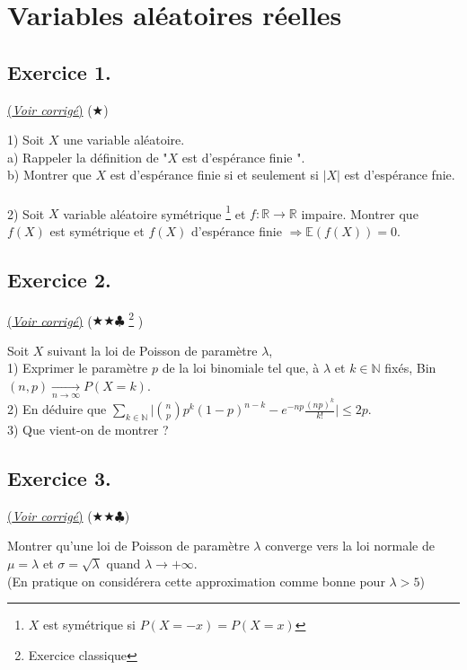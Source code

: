 \documentclass{article}
\newcommand{\R}{\mathbb{R}}
\newcommand{\N}{\mathbb{N}}
\newcommand{\E}{\mathbb{E}}
\newcommand{\Ra}{\Rightarrow}
\newcommand{\ra}{\rightarrow}
\newcommand{\0}{\emptyset}
\begin{document}
\section*{Variables aléatoires réelles}

\subsection*{Exercice 1.}
\hyperref[subsec:corr1]{(\textit{Voir corrigé})} ($\bigstar$)
\label{subsec:ex1}
\begin{flushleft}
1) Soit $X$ une variable aléatoire.\\
a) Rappeler la définition de "$X$ est d'espérance finie ".\\
b) Montrer que $X$ est d'espérance finie si et seulement si $|X|$ est d'espérance fnie.\\
\text{ }\\
2) Soit $X$ variable aléatoire symétrique \footnote{\label{sym} $X$ est symétrique si $P(X=-x)=P(X=x)$} et $f :\R\ra\R$ impaire. Montrer que $f(X)$ est symétrique et $f(X)$ d'espérance finie $\Ra \E(f(X))=0$.\\
\end{flushleft}




\subsection*{Exercice 2.}
\hyperref[subsec:corr2]{(\textit{Voir corrigé})} ($\bigstar \bigstar\clubsuit$ \footnote{ Exercice classique} )
\label{subsec:ex2}
\begin{flushleft}
Soit $X$ suivant la loi de Poisson de paramètre $\lambda$,\\
1) Exprimer le paramètre $p$ de la loi binomiale tel que, à $\lambda$ et $k\in\N$ fixés, Bin$(n,p) \underset{n\to\infty}{\longrightarrow} P(X=k)$.\\
2) En déduire que $\sum_{k\in\N} \Big| \binom{n}{p} p^k (1-p)^{n-k} - e^{-np}\frac{(np)^k}{k!} \Big|\leqslant 2p$.\\
3) Que vient-on de montrer ?\\
\end{flushleft}


\subsection*{Exercice 3.}
\hyperref[subsec:corr3]{(\textit{Voir corrigé})} ($\bigstar \bigstar\clubsuit$)
\label{subsec:ex3}
\begin{flushleft}
Montrer qu'une loi de Poisson de paramètre $\lambda$ converge vers la loi normale de $\mu=\lambda$ et $\sigma = \sqrt{\lambda}$ quand $\lambda\to+\infty$.\\
(En pratique on considérera cette approximation comme bonne pour $\lambda>5$)\\
\end{flushleft}
\end{document}
